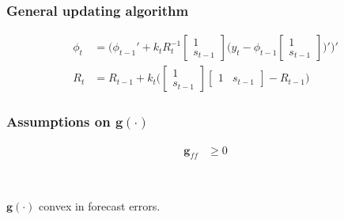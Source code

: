 \documentclass[10pt]{beamer}
\begin{document}
\begin{frame}[plain]  %
	\frametitle{General updating algorithm}
	\label{RLS}


\begin{align}
\phi_t  & = \bigg( \phi_{t-1}' + k_t R_t^{-1}\begin{bmatrix} 1 \\ s_{t-1} \end{bmatrix}\bigg(y_{t} - \phi_{t-1} \begin{bmatrix} 1 \\ s_{t-1} \end{bmatrix} \bigg)' \bigg)' \\
R_t &= R_{t-1} +  k_t \bigg( \begin{bmatrix} 1 \\ s_{t-1} \end{bmatrix} \begin{bmatrix} 1 & s_{t-1} \end{bmatrix}  - R_{t-1} \bigg)
\end{align}


\vfill

\hyperlink{RLS_special}{}	


\end{frame}

\begin{frame}[plain]  %
	\frametitle{Assumptions on $\mathbf{g}(\cdot)$}
	\label{ass_g}


\begin{align}
\mathbf{g}_{ff} & \geq 0 \label{ass_g2}
\end{align}

\

$\mathbf{g}(\cdot)$ convex in forecast errors.

\vfill

\hyperlink{cgain_dgain}{}	


\end{frame}
\end{document}
